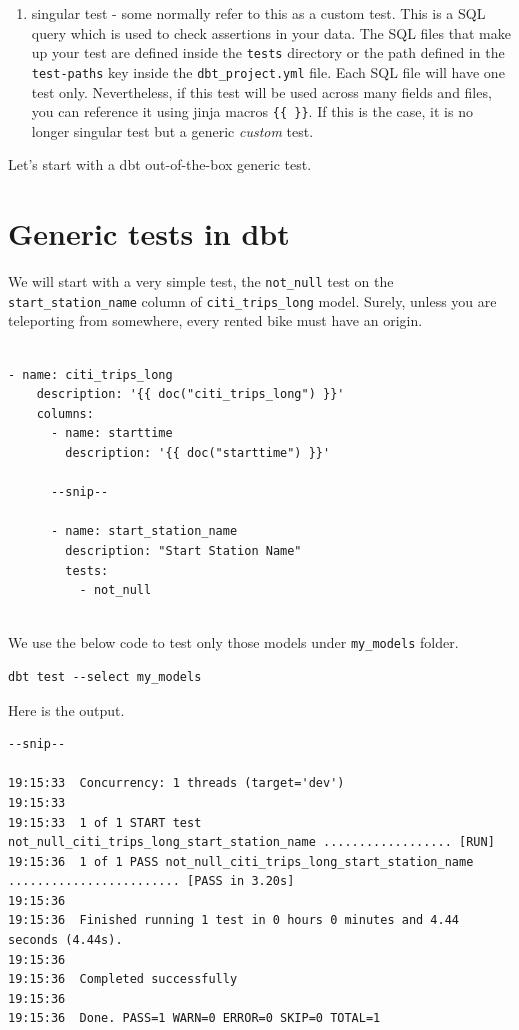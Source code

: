 \documentclass[
]{book}
\providecommand{\tightlist}{%
  \setlength{\itemsep}{0pt}\setlength{\parskip}{0pt}}
\begin{document}
\begin{enumerate}
\def\labelenumi{\arabic{enumi}.}
\setcounter{enumi}{1}
\tightlist
\item
  singular test - some normally refer to this as a custom test. This is a SQL query which is used to check assertions in your data. The SQL files that make up your test are defined inside the \texttt{tests} directory or the path defined in the \texttt{test-paths} key inside the \texttt{dbt\_project.yml} file. Each SQL file will have one test only. Nevertheless, if this test will be used across many fields and files, you can reference it using jinja macros \texttt{\{\{\ \}\}}. If this is the case, it is no longer singular test but a generic \emph{custom} test.
\end{enumerate}

Let's start with a dbt out-of-the-box generic test.

\hypertarget{generic-tests-in-dbt}{%
\section{Generic tests in dbt}\label{generic-tests-in-dbt}}

We will start with a very simple test, the \texttt{not\_null} test on the \texttt{start\_station\_name} column of \texttt{citi\_trips\_long} model. Surely, unless you are teleporting from somewhere, every rented bike must have an origin.

\begin{verbatim}

- name: citi_trips_long
    description: '{{ doc("citi_trips_long") }}'
    columns:
      - name: starttime
        description: '{{ doc("starttime") }}'

      --snip--

      - name: start_station_name
        description: "Start Station Name"
        tests:
          - not_null
          
\end{verbatim}

We use the below code to test only those models under \texttt{my\_models} folder.

\begin{verbatim}
dbt test --select my_models
\end{verbatim}

Here is the output.

\begin{verbatim}
--snip--

19:15:33  Concurrency: 1 threads (target='dev')
19:15:33  
19:15:33  1 of 1 START test not_null_citi_trips_long_start_station_name .................. [RUN]
19:15:36  1 of 1 PASS not_null_citi_trips_long_start_station_name ........................ [PASS in 3.20s]
19:15:36  
19:15:36  Finished running 1 test in 0 hours 0 minutes and 4.44 seconds (4.44s).
19:15:36  
19:15:36  Completed successfully
19:15:36  
19:15:36  Done. PASS=1 WARN=0 ERROR=0 SKIP=0 TOTAL=1
\end{verbatim}
\end{document}
